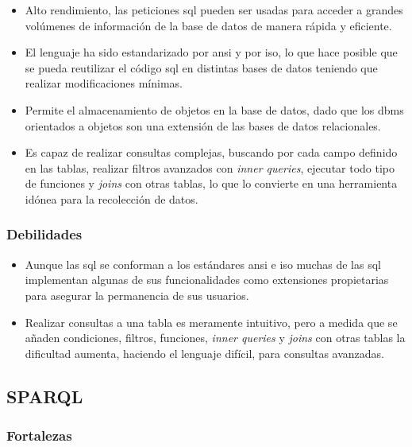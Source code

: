 \begin{itemize}
	\item Alto rendimiento, las peticiones \acrshort{sql} pueden ser usadas para acceder a grandes volúmenes de información de la base de datos de manera rápida y eficiente.

	\item El lenguaje ha sido estandarizado por \acrshort{ansi} y por \acrshort{iso}, lo que hace posible que se pueda reutilizar el código \acrshort{sql} en distintas bases de datos teniendo que realizar modificaciones mínimas.

	\item Permite el almacenamiento de objetos en la base de datos, dado que los \acrshort{dbms} orientados a objetos\cite{OODB} son una extensión de las bases de datos relacionales.

	\item Es capaz de realizar consultas complejas, buscando por cada campo definido en las tablas, realizar filtros avanzados con \textit{inner queries}, ejecutar todo tipo de funciones y \textit{joins} con otras tablas, lo que lo convierte en una herramienta idónea para la recolección de datos.
\end{itemize}

\subsubsection{Debilidades}

\begin{itemize}
	\item Aunque las  \acrshort{sql} se conforman a los estándares \acrshort{ansi} e \acrshort{iso} muchas de las  \acrshort{sql} implementan algunas de sus funcionalidades como extensiones propietarias para asegurar la permanencia de sus usuarios.

	\item Realizar consultas a una tabla es meramente intuitivo, pero a medida que se añaden condiciones, filtros, funciones, \textit{inner queries} y \textit{joins} con otras tablas la dificultad aumenta, haciendo el lenguaje difícil, para consultas avanzadas.
\end{itemize}

\subsection{SPARQL}

\subsubsection{Fortalezas}

